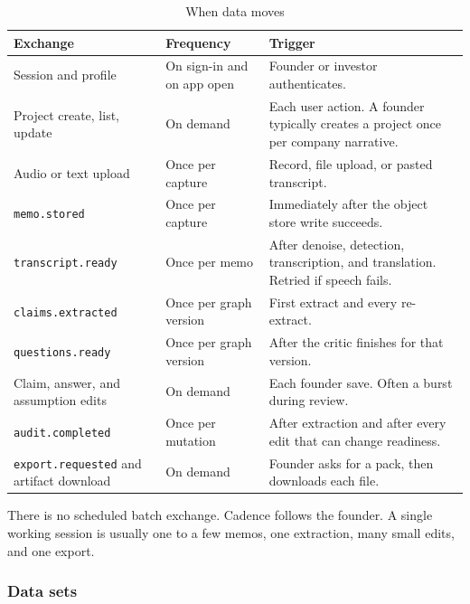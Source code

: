 \documentclass[11pt,a4paper]{article}
\begin{document}
\begin{table}[ht]
\centering
\caption{When data moves}
\label{tab:freq}
\small
\begin{tabularx}{\textwidth}{@{}l l X@{}}
\toprule
\textbf{Exchange} & \textbf{Frequency} & \textbf{Trigger} \\
\midrule
Session and profile &
On sign-in and on app open &
Founder or investor authenticates. \\
Project create, list, update &
On demand &
Each user action. A founder typically creates a project once per company narrative. \\
Audio or text upload &
Once per capture &
Record, file upload, or pasted transcript. \\
\texttt{memo.stored} &
Once per capture &
Immediately after the object store write succeeds. \\
\texttt{transcript.ready} &
Once per memo &
After denoise, detection, transcription, and translation. Retried if speech fails. \\
\texttt{claims.extracted} &
Once per graph version &
First extract and every re-extract. \\
\texttt{questions.ready} &
Once per graph version &
After the critic finishes for that version. \\
Claim, answer, and assumption edits &
On demand &
Each founder save. Often a burst during review. \\
\texttt{audit.completed} &
Once per mutation &
After extraction and after every edit that can change readiness. \\
\texttt{export.requested} and artifact download &
On demand &
Founder asks for a pack, then downloads each file. \\
\bottomrule
\end{tabularx}
\end{table}

There is no scheduled batch exchange. Cadence follows the founder. A single working session is usually one to a few memos, one extraction, many small edits, and one export.

\subsubsection{Data sets}
\end{document}
